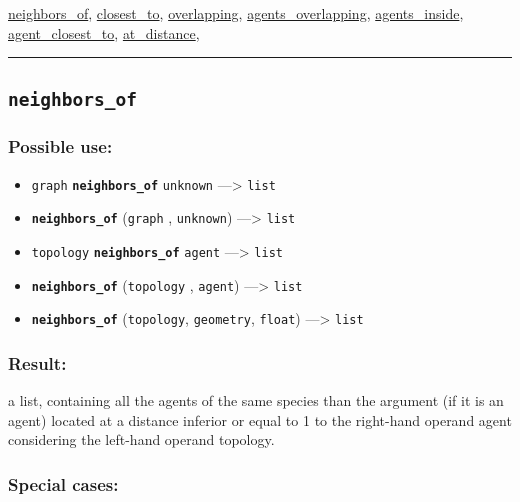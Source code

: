 \documentclass[]{book}
\providecommand{\tightlist}{%
  \setlength{\itemsep}{0pt}\setlength{\parskip}{0pt}}
\theoremstyle{definition}
\theoremstyle{definition}
\theoremstyle{definition}
\theoremstyle{remark}
\begin{document}
\href{OperatorsNR\#neighbors_of}{neighbors\_of},
\href{OperatorsBC\#closest_to}{closest\_to},
\href{OperatorsNR\#overlapping}{overlapping},
\href{OperatorsAA\#agents_overlapping}{agents\_overlapping},
\href{OperatorsAA\#agents_inside}{agents\_inside},
\href{OperatorsAA\#agent_closest_to}{agent\_closest\_to},
\href{OperatorsAA\#at_distance}{at\_distance},

\begin{center}\rule{0.5\linewidth}{\linethickness}\end{center}

\subsection{\texorpdfstring{\texttt{neighbors\_of}}{neighbors\_of}}\label{neighbors_of}

\subsubsection{Possible use:}\label{possible-use-367}

\begin{itemize}
\tightlist
\item
  \texttt{graph} \textbf{\texttt{neighbors\_of}} \texttt{unknown}
  ---\textgreater{} \texttt{list}
\item
  \textbf{\texttt{neighbors\_of}} (\texttt{graph} , \texttt{unknown})
  ---\textgreater{} \texttt{list}
\item
  \texttt{topology} \textbf{\texttt{neighbors\_of}} \texttt{agent}
  ---\textgreater{} \texttt{list}
\item
  \textbf{\texttt{neighbors\_of}} (\texttt{topology} , \texttt{agent})
  ---\textgreater{} \texttt{list}
\item
  \textbf{\texttt{neighbors\_of}} (\texttt{topology}, \texttt{geometry},
  \texttt{float}) ---\textgreater{} \texttt{list}
\end{itemize}

\subsubsection{Result:}\label{result-355}

a list, containing all the agents of the same species than the argument
(if it is an agent) located at a distance inferior or equal to 1 to the
right-hand operand agent considering the left-hand operand topology.

\subsubsection{Special cases:}\label{special-cases-103}
\end{document}
